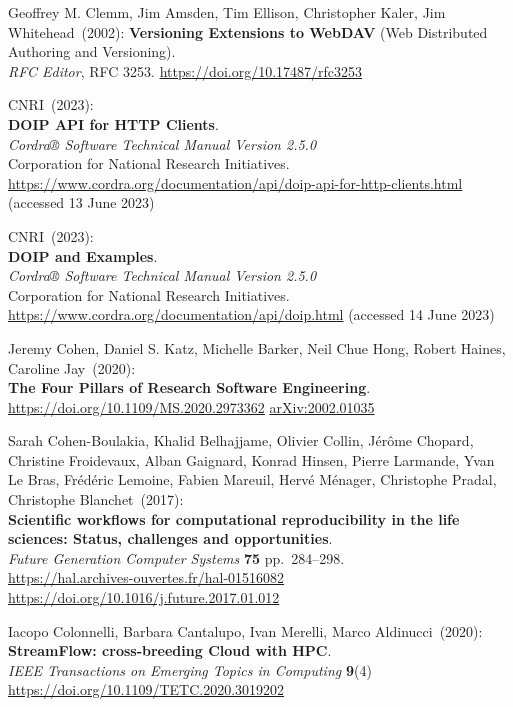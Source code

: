 \begin{thebibliography}{9}
Geoffrey M. Clemm, Jim Amsden, Tim Ellison, Christopher Kaler, Jim Whitehead~(2002):
\textbf{Versioning Extensions to WebDAV} (Web Distributed Authoring and Versioning).\\
\emph{RFC Editor}, RFC 3253.
\url{https://doi.org/10.17487/rfc3253}

CNRI~(2023): \\
\textbf{DOIP API for HTTP Clients}.\\
\emph{Cordra® Software Technical Manual Version 2.5.0}\\
Corporation for National Research Initiatives.\\
\url{https://www.cordra.org/documentation/api/doip-api-for-http-clients.html}
(accessed 13 June 2023)

CNRI~(2023): \\
\textbf{DOIP and Examples}.\\
\emph{Cordra® Software Technical Manual Version 2.5.0}\\
Corporation for National Research Initiatives.\\
\url{https://www.cordra.org/documentation/api/doip.html}
(accessed 14 June 2023)

Jeremy Cohen, Daniel S. Katz, Michelle Barker, Neil Chue Hong, Robert Haines, Caroline Jay~(2020):\\
\textbf{The Four Pillars of Research Software Engineering}.\\
\url{https://doi.org/10.1109/MS.2020.2973362}
\href{https://doi.org/10.48550/arXiv.2002.01035}{arXiv:2002.01035}

Sarah Cohen-Boulakia, Khalid Belhajjame, Olivier Collin, Jérôme
Chopard, Christine Froidevaux, Alban Gaignard, Konrad Hinsen, Pierre
Larmande, Yvan Le Bras, Frédéric Lemoine, Fabien Mareuil, Hervé Ménager,
Christophe Pradal, Christophe Blanchet~(2017): \\
\textbf{Scientific workflows for computational reproducibility in the
life sciences: Status, challenges and opportunities}.\\
\emph{Future Generation Computer Systems} \textbf{75} pp.~284--298.\\
\url{https://hal.archives-ouvertes.fr/hal-01516082}\\
\url{https://doi.org/10.1016/j.future.2017.01.012}

Iacopo Colonnelli, Barbara Cantalupo, Ivan Merelli, Marco Aldinucci~(2020): \\
\textbf{StreamFlow: cross-breeding Cloud with HPC}.\\
\emph{IEEE Transactions on Emerging Topics in Computing} \textbf{9}(4)\\
\url{https://doi.org/10.1109/TETC.2020.3019202}


\end{thebibliography}

